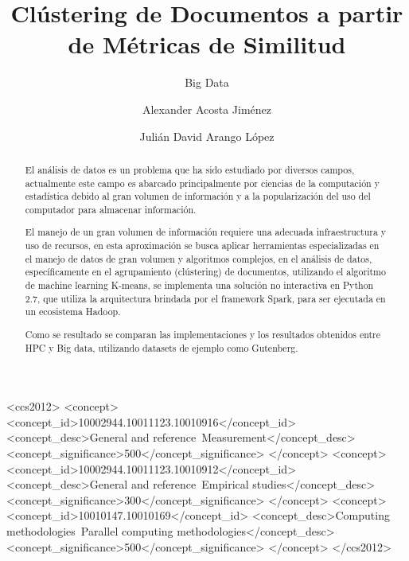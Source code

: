 \documentclass[sigconf]{acmart}
\begin{document}
\title{Clústering de Documentos a partir de Métricas de Similitud}
\subtitle{Big Data}


\author{Alexander Acosta Jiménez}

\author{Julián David Arango López}

\renewcommand{\shortauthors}{Acosta, Arango}

\begin{abstract}
El análisis de datos es un problema que ha sido estudiado por diversos campos,
actualmente este campo es abarcado principalmente por ciencias de la computación
y estadística debido al gran volumen de información y a la popularización del
uso del computador para almacenar información.

El manejo de un gran volumen de información requiere una adecuada infraestructura
y uso de recursos, en esta aproximación se busca aplicar herramientas
especializadas en el manejo de datos de gran volumen y algoritmos complejos,
en el análisis de datos, específicamente en el agrupamiento (clústering)
de documentos, utilizando  el algoritmo de machine learning K-means,
se implementa una solución no interactiva en Python 2.7, que utiliza la
arquitectura brindada por el framework Spark, para ser ejecutada en un ecosistema
Hadoop.

Como se resultado se comparan las implementaciones y los resultados obtenidos
entre HPC y Big data, utilizando datasets de ejemplo como Gutenberg.
\end{abstract}
%
%
\begin{CCSXML}
<ccs2012>
<concept>
<concept_id>10002944.10011123.10010916</concept_id>
<concept_desc>General and reference~Measurement</concept_desc>
<concept_significance>500</concept_significance>
</concept>
<concept>
<concept_id>10002944.10011123.10010912</concept_id>
<concept_desc>General and reference~Empirical studies</concept_desc>
<concept_significance>300</concept_significance>
</concept>
<concept>
<concept_id>10010147.10010169</concept_id>
<concept_desc>Computing methodologies~Parallel computing methodologies</concept_desc>
<concept_significance>500</concept_significance>
</concept>
</ccs2012>
\end{CCSXML}
\end{document}

